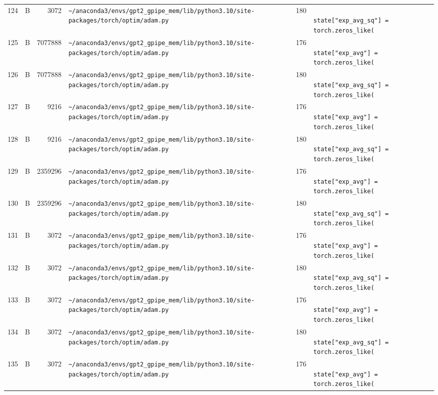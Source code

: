 \documentclass{article}
\begin{document}
\begin{longtable}{r l r p{6.5cm} r p{7.0cm}}
124 & B & 3072 & \lstinline|~/anaconda3/envs/gpt2_gpipe_mem/lib/python3.10/site-packages/torch/optim/adam.py| & 180 & \lstinline|                    state["exp_avg_sq"] = torch.zeros_like(| \\
125 & B & 7077888 & \lstinline|~/anaconda3/envs/gpt2_gpipe_mem/lib/python3.10/site-packages/torch/optim/adam.py| & 176 & \lstinline|                    state["exp_avg"] = torch.zeros_like(| \\
126 & B & 7077888 & \lstinline|~/anaconda3/envs/gpt2_gpipe_mem/lib/python3.10/site-packages/torch/optim/adam.py| & 180 & \lstinline|                    state["exp_avg_sq"] = torch.zeros_like(| \\
127 & B & 9216 & \lstinline|~/anaconda3/envs/gpt2_gpipe_mem/lib/python3.10/site-packages/torch/optim/adam.py| & 176 & \lstinline|                    state["exp_avg"] = torch.zeros_like(| \\
128 & B & 9216 & \lstinline|~/anaconda3/envs/gpt2_gpipe_mem/lib/python3.10/site-packages/torch/optim/adam.py| & 180 & \lstinline|                    state["exp_avg_sq"] = torch.zeros_like(| \\
129 & B & 2359296 & \lstinline|~/anaconda3/envs/gpt2_gpipe_mem/lib/python3.10/site-packages/torch/optim/adam.py| & 176 & \lstinline|                    state["exp_avg"] = torch.zeros_like(| \\
130 & B & 2359296 & \lstinline|~/anaconda3/envs/gpt2_gpipe_mem/lib/python3.10/site-packages/torch/optim/adam.py| & 180 & \lstinline|                    state["exp_avg_sq"] = torch.zeros_like(| \\
131 & B & 3072 & \lstinline|~/anaconda3/envs/gpt2_gpipe_mem/lib/python3.10/site-packages/torch/optim/adam.py| & 176 & \lstinline|                    state["exp_avg"] = torch.zeros_like(| \\
132 & B & 3072 & \lstinline|~/anaconda3/envs/gpt2_gpipe_mem/lib/python3.10/site-packages/torch/optim/adam.py| & 180 & \lstinline|                    state["exp_avg_sq"] = torch.zeros_like(| \\
133 & B & 3072 & \lstinline|~/anaconda3/envs/gpt2_gpipe_mem/lib/python3.10/site-packages/torch/optim/adam.py| & 176 & \lstinline|                    state["exp_avg"] = torch.zeros_like(| \\
134 & B & 3072 & \lstinline|~/anaconda3/envs/gpt2_gpipe_mem/lib/python3.10/site-packages/torch/optim/adam.py| & 180 & \lstinline|                    state["exp_avg_sq"] = torch.zeros_like(| \\
135 & B & 3072 & \lstinline|~/anaconda3/envs/gpt2_gpipe_mem/lib/python3.10/site-packages/torch/optim/adam.py| & 176 & \lstinline|                    state["exp_avg"] = torch.zeros_like(| \\

\end{longtable}
\end{document}
